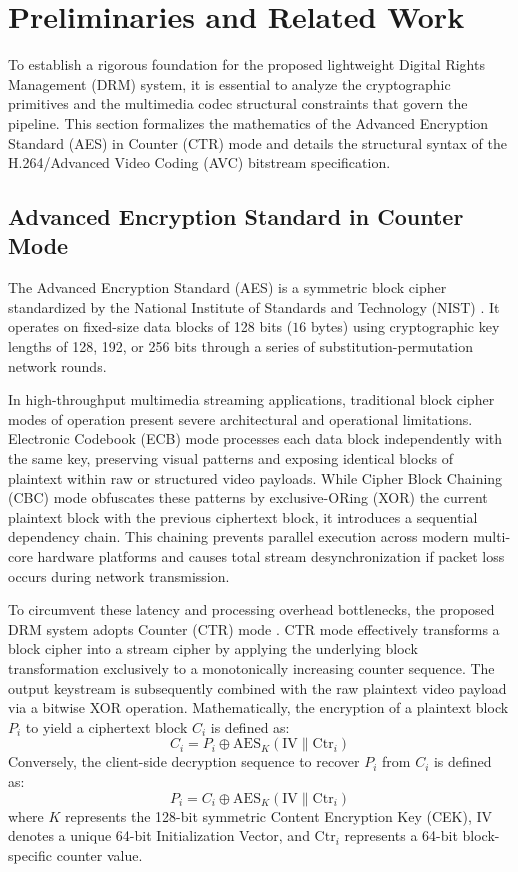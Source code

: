 \section{Preliminaries and Related Work}
To establish a rigorous foundation for the proposed lightweight Digital Rights Management (DRM) system, it is essential to analyze the cryptographic primitives and the multimedia codec structural constraints that govern the pipeline. This section formalizes the mathematics of the Advanced Encryption Standard (AES) in Counter (CTR) mode and details the structural syntax of the H.264/Advanced Video Coding (AVC) bitstream specification.

\subsection{Advanced Encryption Standard in Counter Mode}
The Advanced Encryption Standard (AES) is a symmetric block cipher standardized by the National Institute of Standards and Technology (NIST) \cite{nist2001aes}. It operates on fixed-size data blocks of 128 bits ($16$ bytes) using cryptographic key lengths of 128, 192, or 256 bits through a series of substitution-permutation network rounds. 

In high-throughput multimedia streaming applications, traditional block cipher modes of operation present severe architectural and operational limitations. Electronic Codebook (ECB) mode processes each data block independently with the same key, preserving visual patterns and exposing identical blocks of plaintext within raw or structured video payloads. While Cipher Block Chaining (CBC) mode obfuscates these patterns by exclusive-ORing (XOR) the current plaintext block with the previous ciphertext block, it introduces a sequential dependency chain. This chaining prevents parallel execution across modern multi-core hardware platforms and causes total stream desynchronization if packet loss occurs during network transmission.

To circumvent these latency and processing overhead bottlenecks, the proposed DRM system adopts Counter (CTR) mode \cite{winkler2024selective}. CTR mode effectively transforms a block cipher into a stream cipher by applying the underlying block transformation exclusively to a monotonically increasing counter sequence. The output keystream is subsequently combined with the raw plaintext video payload via a bitwise XOR operation. Mathematically, the encryption of a plaintext block $P_i$ to yield a ciphertext block $C_i$ is defined as:
\begin{equation}
C_i = P_i \oplus \text{AES}_K(\text{IV} \parallel \text{Ctr}_i)
\end{equation}
Conversely, the client-side decryption sequence to recover $P_i$ from $C_i$ is defined as:
\begin{equation}
P_i = C_i \oplus \text{AES}_K(\text{IV} \parallel \text{Ctr}_i)
\end{equation}
where $K$ represents the 128-bit symmetric Content Encryption Key (CEK), $\text{IV}$ denotes a unique 64-bit Initialization Vector, and $\text{Ctr}_i$ represents a 64-bit block-specific counter value. 


